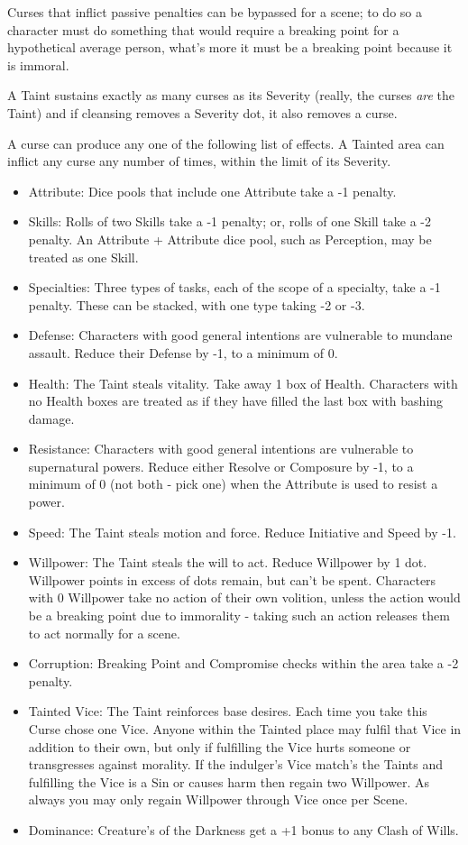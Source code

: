 Curses that inflict passive penalties can be bypassed for a scene; to do so a character must do something that would require a breaking point for a hypothetical average person, what's more it must be a breaking point because it is immoral. 

A Taint sustains exactly as many curses as its Severity (really, the curses \textit{are} the Taint) and if cleansing removes a Severity dot, it also removes a curse.

A curse can produce any one of the following list of effects. A Tainted area can inflict any curse any number of times, within the limit of its Severity.

   \begin{itemize}
    \item Attribute: Dice pools that include one Attribute take a -1 penalty.
    \item     Skills: Rolls of two Skills take a -1 penalty; or, rolls of one Skill take a -2 penalty. An Attribute + Attribute dice pool, such as Perception, may be treated as one Skill.
    \item    Specialties: Three types of tasks, each of the scope of a specialty, take a -1 penalty. These can be stacked, with one type taking -2 or -3.
    \item Defense: Characters with good general intentions are vulnerable to mundane assault. Reduce their Defense by -1, to a minimum of 0.
    \item Health: The Taint steals vitality. Take away 1 box of Health. Characters with no Health boxes are treated as if they have filled the last box with bashing damage.
    \item Resistance: Characters with good general intentions are vulnerable to supernatural powers. Reduce either Resolve or Composure by -1, to a minimum of 0 (not both - pick one) when the Attribute is used to resist a power.
    \item Speed: The Taint steals motion and force. Reduce Initiative and Speed by -1.
    \item Willpower: The Taint steals the will to act. Reduce Willpower by 1 dot. Willpower points in excess of dots remain, but can't be spent. Characters with 0 Willpower take no action of their own volition, unless the action would be a breaking point due to immorality - taking such an action releases them to act normally for a scene.
    \item Corruption: Breaking Point and Compromise checks within the area take a -2 penalty.
    \item Tainted Vice: The Taint reinforces base desires. Each time you take this Curse chose one Vice. Anyone within the Tainted place may fulfil that Vice in addition to their own, but only if fulfilling the Vice hurts someone or transgresses against morality. If the indulger's Vice match's the Taints and fulfilling the Vice is a Sin or causes harm then regain two Willpower. As always you may only regain Willpower through Vice once per Scene.  
    \item Dominance: Creature's of the Darkness get a +1 bonus to any Clash of Wills.
    \end{itemize}


